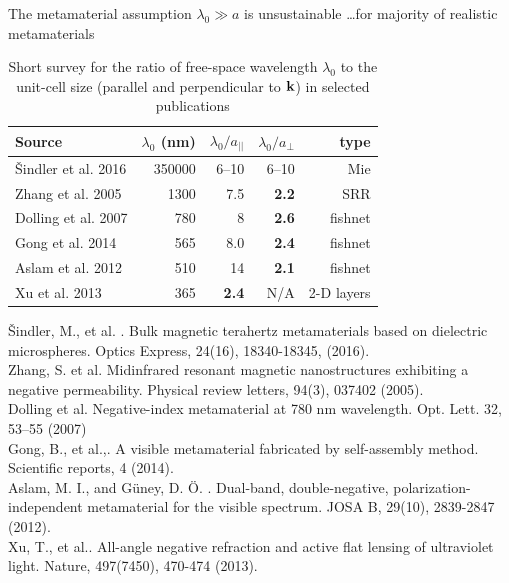 \documentclass[t]{beamer} \usepackage[english]{babel} \usepackage[utf8]{inputenc} \usetheme{Frankfurt} %
\begin{document}
\begin{frame}{The metamaterial assumption $\lambda_0 \gg a$ is unsustainable}	%
	{\vspace{-.1em}\hfill \ldots for majority of realistic metamaterials}

\vspace{-1em}
\begin{table}[ht]   \caption{Short survey for the ratio of free-space wavelength $\lambda_0$ to the unit-cell size (parallel and perpendicular to ${\mathbf{k}}$) in selected publications}  \label{tb_} \centering 
\begin{tabular}{lrrrr}
\toprule
	Source		 & $\lambda_0$ (nm)	& $\lambda_0/a_{||}$  & $\lambda_0/a_{\perp}$ & type \\
\hline
Šindler et al. 2016  & 350000		&  6--10	& 6--10 & Mie \\
Zhang et al. 2005    & 1300			&  7.5      & \textbf{2.2}  & SRR \\
Dolling et al. 2007  & 780			&  8		& \textbf{2.6}  & fishnet \\
Gong et al. 2014     & 565			&  8.0		& \textbf{2.4}  & fishnet \\
Aslam et al. 2012    & 510			&  14		& \textbf{2.1}  & fishnet \\
Xu et al. 2013	     & 365		    & \textbf{2.4}		& N/A	& 2-D layers \\
\bottomrule
\end{tabular} \end{table}

	\vfill
	\tiny{	
Šindler, M., et al. . Bulk magnetic terahertz metamaterials based on dielectric microspheres. Optics Express, 24(16), 18340-18345, (2016).\\
Zhang, S. et al.  Midinfrared resonant magnetic nanostructures exhibiting a negative permeability. Physical review letters, 94(3), 037402 (2005).\\
Dolling et al. Negative-index metamaterial at 780 nm wavelength. Opt. Lett. 32, 53–55 (2007)\\
Gong, B., et al.,. A visible metamaterial fabricated by self-assembly method. Scientific reports, 4 (2014).\\
Aslam, M. I., and Güney, D. Ö. . Dual-band, double-negative, polarization-independent metamaterial for the visible spectrum. JOSA B, 29(10), 2839-2847 (2012).\\
Xu, T., et al.. All-angle negative refraction and active flat lensing of ultraviolet light. Nature, 497(7450), 470-474  (2013).}
\end{frame} 		%
\end{document}
